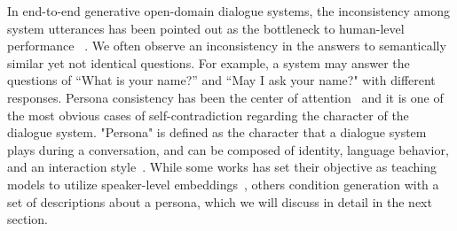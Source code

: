In end-to-end generative open-domain dialogue systems, the inconsistency among system utterances has been pointed out as the bottleneck to human-level performance ~. We often observe an inconsistency in the answers to semantically similar yet not identical questions. For example, a system may answer the questions of ``What is your name?'' and ``May I ask your name?" with different responses. Persona consistency has been the center of attention~ and it is one of the most obvious cases of self-contradiction regarding the character of the dialogue system. "Persona" is defined as the character that a dialogue system plays during a conversation, and can be composed of identity, language behavior, and an interaction style~. While some works has set their objective as teaching models to utilize speaker-level embeddings~, others condition generation with a set of descriptions about a persona, which we will discuss in detail in the next section.

